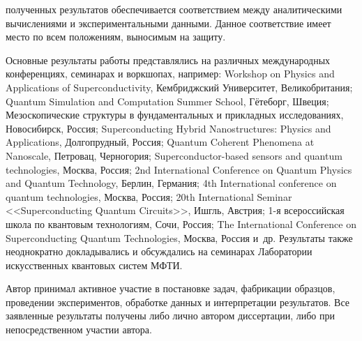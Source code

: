 {\reliability} полученных результатов обеспечивается соответствием между аналитическими вычислениями и экспериментальными данными. Данное соответствие имеет место по всем положениям, выносимым на защиту. 

{\probation}
Основные результаты работы представлялись на различных международных конференциях, семинарах и воркшопах, например: Workshop on Physics and Applications of Superconductivity, Кембриджский Университет, Великобритания; Quantum Simulation and Computation Summer School, Гётеборг, Швеция;  Мезоскопические структуры в  фундаментальных и прикладных исследованиях, Новосибирск, Россия; Superconducting Hybrid Nanostructures: Physics and Applications, Долгопрудный, Россия; Quantum Coherent Phenomena at Nanoscale, Петровац, Черногория; Superconductor-based sensors and quantum technologies, Москва, Россия; 2nd International Conference on Quantum Physics and Quantum Technology, Берлин, Германия; 4th International conference on quantum technologies, Москва, Россия; 20th International Seminar <<Superconducting Quantum Circuits>>, Ишгль, Австрия; 1-я всероссийская школа по квантовым технологиям, Сочи, Россия; The International Conference on Superconducting Quantum Technologies, Москва, Россия и~др. Результаты также неоднократно докладывались и обсуждались на семинарах Лаборатории искусственных квантовых систем МФТИ.


{\contribution} Автор принимал активное участие в постановке задач, фабрикации образцов, проведении экспериментов, обработке данных и интерпретации результатов. Все заявленные результаты получены либо лично автором диссертации, либо при непосредственном участии автора.


